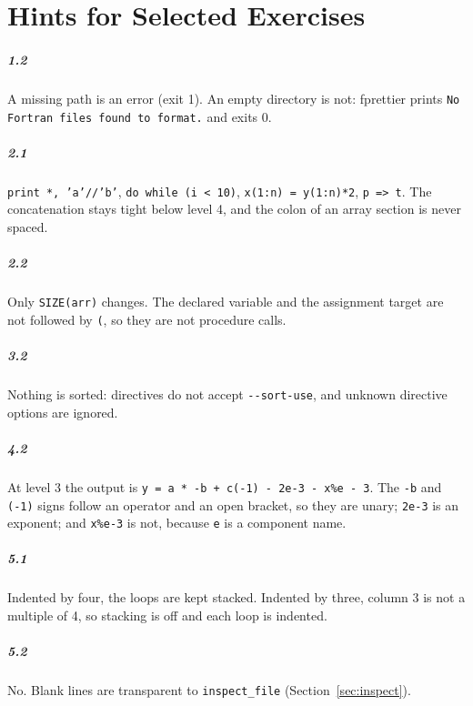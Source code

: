 \documentclass[11pt,a4paper,openany]{book}
\newcommand{\code}[1]{\texttt{\small #1}}
\newcommand{\flag}[1]{\texttt{\small -{}-#1}}
\begin{document}
\chapter{Hints for Selected Exercises}

\paragraph{1.2} A missing path is an error (exit 1). An empty directory is not:
fprettier prints \code{No Fortran files found to format.} and exits 0.

\paragraph{2.1} \code{print *, 'a'//'b'}, \code{do while (i < 10)},
\code{x(1:n) = y(1:n)*2}, \code{p => t}. The concatenation stays tight below
level 4, and the colon of an array section is never spaced.

\paragraph{2.2} Only \code{SIZE(arr)} changes. The declared variable and the
assignment target are not followed by \code{(}, so they are not procedure
calls.

\paragraph{3.2} Nothing is sorted: directives do not accept \flag{sort-use}, and
unknown directive options are ignored.

\paragraph{4.2} At level 3 the output is \code{y = a * -b + c(-1) - 2e-3 - x\%e - 3}.
The \code{-b} and \code{(-1)} signs follow an operator and an open bracket, so
they are unary; \code{2e-3} is an exponent; and \code{x\%e-3} is not, because
\code{e} is a component name.

\paragraph{5.1} Indented by four, the loops are kept stacked. Indented by
three, column 3 is not a multiple of 4, so stacking is off and each loop is
indented.

\paragraph{5.2} No. Blank lines are transparent to \code{inspect\_file}
(Section~\ref{sec:inspect}).
\end{document}
